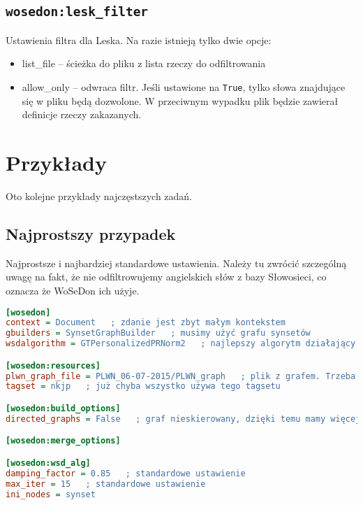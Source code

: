 \documentclass[10pt,a4paper]{article}
\begin{document}
\subsection{\texttt{wosedon:lesk\_filter}}
Ustawienia filtra dla Leska. Na razie istnieją tylko dwie opcje:
\begin{itemize}
	\item list\_file -- ścieżka do pliku z lista rzeczy do odfiltrowania
	\item allow\_only -- odwraca filtr. Jeśli ustawione na \texttt{True}, tylko słowa znajdujące się w pliku będą dozwolone. W przeciwnym wypadku plik będzie zawierał definicje rzeczy zakazanych.
\end{itemize}

\section{Przykłady}
\label{sec:przyklady}
Oto kolejne przykłady najczęstszych zadań.

\subsection{Najprostszy przypadek}
Najprostsze i najbardziej standardowe ustawienia. Należy tu zwrócić szczególną uwagę na fakt, że nie odfiltrowujemy angielskich słów z bazy Słowosieci, co oznacza że WoSeDon ich użyje.

\begin{lstlisting}[language=Ini]
[wosedon]
context = Document   ; zdanie jest zbyt małym kontekstem
gbuilders = SynsetGraphBuilder   ; musimy użyć grafu synsetów
wsdalgorithm = GTPersonalizedPRNorm2   ; najlepszy algorytm działający w sensownym czasie

[wosedon:resources]
plwn_graph_file = PLWN_06-07-2015/PLWN_graph   ; plik z grafem. Trzeba zwrócić uwagę na brak końcówki: '_syn.xml.gz' zostanie dodane przez program.
tagset = nkjp   ; już chyba wszystko używa tego tagsetu

[wosedon:build_options]
directed_graphs = False   ; graf nieskierowany, dzięki temu mamy więcej połączeń w grafie i wyniki są lepsze

[wosedon:merge_options]

[wosedon:wsd_alg]
damping_factor = 0.85   ; standardowe ustawienie
max_iter = 15   ; standardowe ustawienie
ini_nodes = synset

\end{lstlisting}
\end{document}
